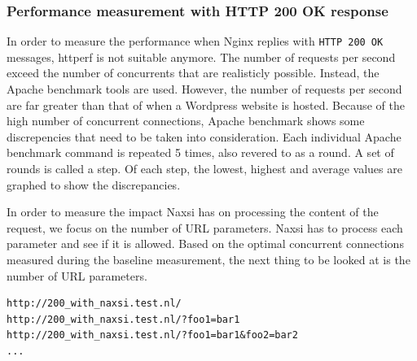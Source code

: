 \documentclass[Methods]{subfiles}
\begin{document}
\subsubsection{Performance measurement with HTTP 200 OK response}
In order to measure the performance when Nginx replies with \verb+HTTP 200 OK+ messages, httperf is not suitable anymore. The number of requests per second exceed the number of concurrents that are realisticly possible. Instead, the Apache benchmark tools are used. However, the number of requests per second are far greater than that of when a Wordpress website is hosted. Because of the high number of concurrent connections, Apache benchmark shows some discrepencies that need to be taken into consideration. Each individual Apache benchmark command is repeated 5 times, also revered to as a round. A set of rounds is called a step. Of each step, the lowest, highest and average values are graphed to show the discrepancies.

In order to measure the impact Naxsi has on processing the content of the request, we focus on the number of URL parameters. Naxsi has to process each parameter and see if it is allowed. Based on the optimal concurrent connections measured during the baseline measurement, the next thing to be looked at is the number of URL parameters.

\begin{verbatim}
http://200_with_naxsi.test.nl/
http://200_with_naxsi.test.nl/?foo1=bar1
http://200_with_naxsi.test.nl/?foo1=bar1&foo2=bar2
...
\end{verbatim}
\end{document}

